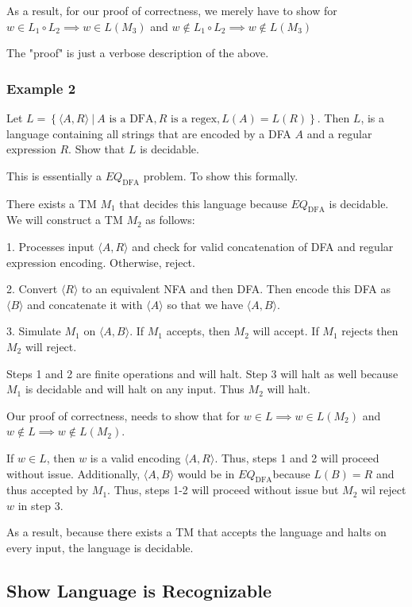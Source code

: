 As a result, for our proof of correctness, we merely have to show for $w
\in L_1\circ L_2 \implies w \in L(M_3)$ and $w\notin L_1\circ L_2
\implies w \notin L(M_3)$

The "proof" is just a verbose description of the above.
\subsubsection{Example 2}
Let $L = \left\{\langle A, R \rangle ~|~ A \textrm{ is a DFA}, R
\textrm{ is a regex}, L(A) = L(R) \right\}$. Then $L$, is a language
containing all strings that are encoded by a DFA $A$ and a regular
expression $R$. Show that $L$ is decidable.

This is essentially a $EQ_{\textrm{DFA}}$ problem. To show this formally.

There exists a TM $M_1$ that decides this language because
$EQ_{\textrm{DFA}}$ is decidable. We will construct a TM $M_2$ as follows:

1. Processes input $\langle A, R \rangle$ and check for valid
concatenation of DFA and regular expression encoding. Otherwise, reject.

2. Convert $\langle R \rangle$ to an equivalent NFA and then DFA. Then encode this DFA as $\langle B \rangle$ and concatenate it with $\langle A \rangle$ so that we have $\langle A, B \rangle$.

3. Simulate $M_1$ on $\langle A, B \rangle$. If $M_1$ accepts, then $M_2$ will accept. If $M_1$ rejects then $M_2$ will reject.

Steps 1 and 2 are finite operations and will halt. Step 3 will halt as
well because $M_1$ is decidable and will halt on any input. Thus $M_2$
will halt.

Our proof of correctness, needs to show that for $w \in L \implies w \in
L(M_2)$ and $w \notin L \implies w \notin L(M_2)$.

If $w \in L$, then $w$ is a valid encoding $\langle A, R \rangle$. Thus, steps 1 and 2 will proceed without issue. Additionally, $\langle A, B \rangle$ would be in $EQ_{\textrm{DFA}}$because $L(B) = R$ and thus accepted by $M_1$. Thus, steps 1-2 will proceed without issue but $M_2$ wil reject $w$ in step 3.

As a result, because there exists a TM that accepts the language and halts on every input, the language is decidable.

\subsection{Show Language is Recognizable}
